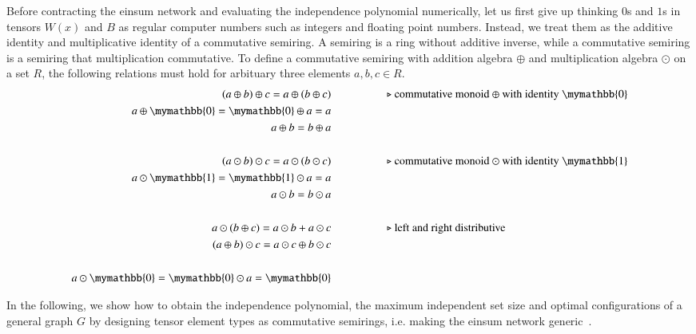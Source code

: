 \documentclass[review,onefignum,onetabnum]{siamart190516}
\newcommand{\<}{\langle}
\renewcommand{\>}{\rangle}
\begin{document}
Before contracting the einsum network and evaluating the independence polynomial numerically, let us first give up thinking $0$s and $1$s in tensors $W(x)$ and $B$ as regular computer numbers such as integers and floating point numbers.
Instead, we treat them as the additive identity and multiplicative identity of a commutative semiring.
A semiring is a ring without additive inverse, while a commutative semiring is a semiring that multiplication commutative.
To define a commutative semiring with addition algebra $\oplus$ and multiplication algebra $\odot$ on a set $R$, the following relations must hold for arbituary three elements $a, b, c \in R$.
\begin{align*}
(a \oplus b) \oplus c = a \oplus (b \oplus c) & \hspace{5em}\text{$\triangleright$ commutative monoid $\oplus$ with identity $\mymathbb{0}$}\\
a \oplus \mymathbb{0} = \mymathbb{0} \oplus a = a &\\
a \oplus b = b \oplus a &\\
&\\
(a \odot b) \odot c = a \odot (b \odot c)  &   \hspace{5em}\text{$\triangleright$ commutative monoid $\odot$ with identity $\mymathbb{1}$}\\
a \odot  \mymathbb{1} =  \mymathbb{1} \odot a = a &\\
a \odot b = b \odot a &\\
&\\
a \odot (b\oplus c) = a\odot b + a\odot c  &  \hspace{5em}\text{$\triangleright$ left and right distributive}\\
(a\oplus b) \odot c = a\odot c \oplus b\odot c &\\
&\\
a \odot \mymathbb{0} = \mymathbb{0} \odot a = \mymathbb{0}
\end{align*}

In the following, we show how to obtain the independence polynomial, the maximum independent set size and optimal configurations of a general graph $G$ by designing tensor element types as commutative semirings,
i.e. making the einsum network generic~\cite{Stepanov2014}.
\end{document}
